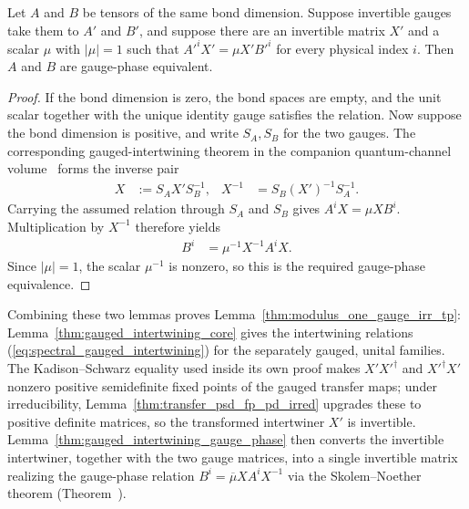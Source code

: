 \begin{lemma}%
    \label{thm:gauged_intertwining_gauge_phase}
    \leanok
    Let $A$ and $B$ be tensors of the same bond dimension. Suppose invertible
    gauges take them to $A'$ and $B'$, and suppose there are an invertible
    matrix $X'$ and a scalar $\mu$ with $|\mu|=1$ such that
    $A'^iX'=\mu X'B'^i$ for every physical index $i$. Then $A$ and $B$ are
    gauge-phase equivalent.
\end{lemma}

\begin{proof}\leanok
    If the bond dimension is zero, the bond spaces are empty, and the unit
    scalar together with the unique identity gauge satisfies the relation.
    Now suppose the bond dimension is positive, and write $S_A,S_B$ for the
    two gauges. The corresponding gauged-intertwining theorem in the companion
    quantum-channel volume~\cite[the square gauge construction]{QICLean2026Blueprint}
    forms the inverse pair
    \begin{align}
        X
         & :=S_AX'S_B^{-1},
         &
        X^{-1}
         & =S_B(X')^{-1}S_A^{-1}.
        \label{eq:spectral_gauged_intertwining_composed_gauge}
    \end{align}
    Carrying the assumed relation through $S_A$ and $S_B$ gives
    $A^iX=\mu XB^i$. Multiplication by $X^{-1}$ therefore yields
    \begin{align}
        B^i
         & =\mu^{-1}X^{-1}A^iX.
        \label{eq:spectral_gauged_intertwining_phase_relation}
    \end{align}
    Since $|\mu|=1$, the scalar $\mu^{-1}$ is nonzero, so this is the required
    gauge-phase equivalence.
\end{proof}

Combining these two lemmas proves Lemma~\ref{thm:modulus_one_gauge_irr_tp}:
Lemma~\ref{thm:gauged_intertwining_core} gives the intertwining relations
(\ref{eq:spectral_gauged_intertwining}) for the separately gauged, unital
families. The Kadison--Schwarz equality used inside its own proof makes
$X'X'^\dagger$ and $X'^\dagger X'$ nonzero positive semidefinite fixed points
of the gauged transfer maps; under irreducibility,
Lemma~\ref{thm:transfer_psd_fp_pd_irred} upgrades these to positive definite
matrices, so the transformed intertwiner $X'$ is invertible.
Lemma~\ref{thm:gauged_intertwining_gauge_phase} then converts the invertible
intertwiner, together with the two gauge matrices, into a single invertible
matrix realizing the gauge-phase relation
$B^i=\overline\mu XA^iX^{-1}$ via the Skolem--Noether theorem
(Theorem~\cite[``Skolem--Noether'']{QICLean2026Blueprint}).

